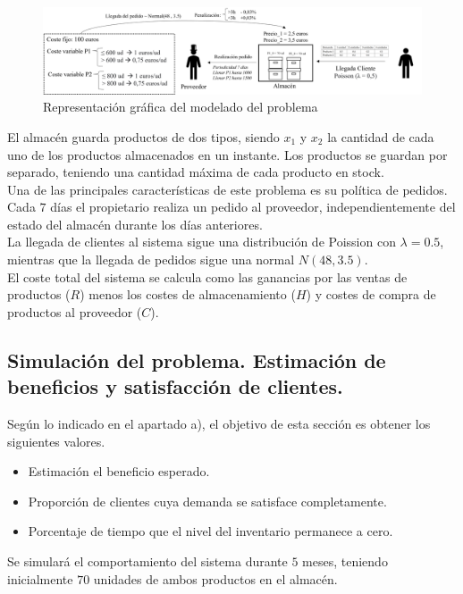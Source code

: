 \documentclass[a4paper,12pt]{article}
\begin{document}
	\begin{figure}[H]
		\centering
		\includegraphics[width=\textwidth]{include/modelo_almacen_v2.png}
		\caption{Representación gráfica del modelado del problema}
	\end{figure}
	
	El almacén guarda productos de dos tipos, siendo $x_1$ y $x_2$ la cantidad de cada uno de los productos almacenados en un instante. Los productos se guardan por separado, teniendo una cantidad máxima de cada producto en stock.\\
	
	Una de las principales características de este problema es su política de pedidos. Cada $7$ días el propietario realiza un pedido al proveedor, independientemente del estado del almacén durante los días anteriores.\\
	
	La llegada de clientes al sistema sigue una distribución de Poission con $\lambda = 0.5$, mientras que la llegada de pedidos sigue una normal $N(48, 3.5)$.\\
	
	El coste total del sistema se calcula como las ganancias por las ventas de productos ($R$) menos los costes de almacenamiento ($H$) y costes de compra de productos al proveedor ($C$).
	
	
	
	\subsection{Simulación del problema. Estimación de beneficios y satisfacción de clientes.}
	Según lo indicado en el apartado a), el objetivo de esta sección es obtener los siguientes valores.
	\begin{itemize}
		\item Estimación el beneficio esperado.
		\item Proporción de clientes cuya demanda se satisface completamente.
		\item Porcentaje de tiempo que el nivel del inventario permanece a cero.
	\end{itemize}
	Se simulará el comportamiento del sistema durante $5$ meses, teniendo inicialmente $70$ unidades de ambos productos en el almacén.
	 	
\end{document}

